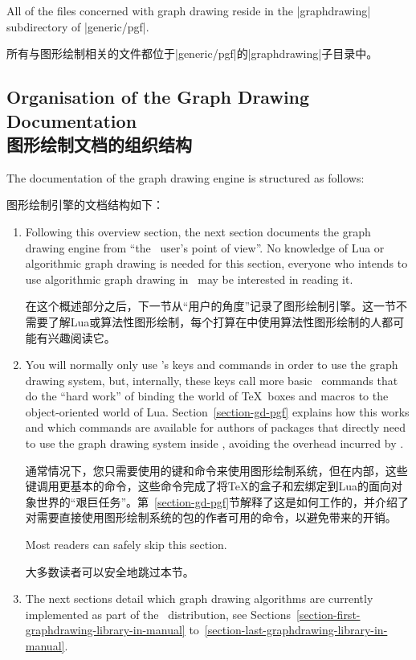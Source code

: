 All of the files concerned with graph drawing reside in the |graphdrawing|
subdirectory of |generic/pgf|.

所有与图形绘制相关的文件都位于|generic/pgf|的|graphdrawing|子目录中。


\subsection{Organisation of the Graph Drawing Documentation\\图形绘制文档的组织结构}

The documentation of the graph drawing engine is structured as follows:

图形绘制引擎的文档结构如下：
\begin{enumerate}
    \item Following this overview section, the next section documents the graph
        drawing engine from ``the \tikzname\ user's point of view''. No
        knowledge of Lua or algorithmic graph drawing is needed for this
        section, everyone who intends to use algorithmic graph drawing in
        \tikzname\ may be interested in reading it.

        在这个概述部分之后，下一节从“用户的角度”记录了图形绘制引擎。这一节不需要了解Lua或算法性图形绘制，每个打算在\tikzname 中使用算法性图形绘制的人都可能有兴趣阅读它。


    \item You will normally only use \tikzname's keys and commands in order to
        use the graph drawing system, but, internally, these keys call more
        basic \pgfname\ commands that do the ``hard work'' of binding the world
        of \TeX\ boxes and macros to the object-oriented world of Lua.
        Section~\ref{section-gd-pgf} explains how this works and which commands
        are available for authors of packages that directly need to use the
        graph drawing system inside \pgfname, avoiding the overhead incurred by
        \tikzname.

        通常情况下，您只需要使用\tikzname 的键和命令来使用图形绘制系统，但在内部，这些键调用更基本的\pgfname 命令，这些命令完成了将\TeX 的盒子和宏绑定到Lua的面向对象世界的“艰巨任务”。第~\ref{section-gd-pgf}节解释了这是如何工作的，并介绍了对需要直接使用图形绘制系统的\pgfname 包的作者可用的命令，以避免\tikzname 带来的开销。



        Most readers can safely skip this section.

        大多数读者可以安全地跳过本节。
    \item The next sections detail which graph drawing algorithms are currently
        implemented as part of the \tikzname\ distribution, see
        Sections~\ref{section-first-graphdrawing-library-in-manual}
        to~\ref{section-last-graphdrawing-library-in-manual}.


\end{enumerate}
